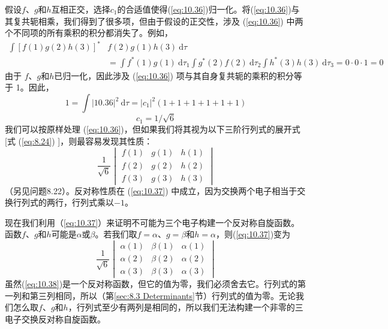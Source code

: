     假设$f$、$g$和$h$互相正交，选择$c_1$的合适值使得(\ref{eq:10.36})归一化。将(\ref{eq:10.36})与其复共轭相乘，我们得到了很多项，但由于假设的正交性，涉及 (\ref{eq:10.36}) 中两个不同项的所有乘积的积分都消失了。例如，
    \begin{equation*}
        \begin{aligned}
            \int \left[f\left(1\right)g\left(2\right)h\left(3\right)\right]^*&f\left(2\right)g\left(1\right)h\left(3\right) \:\mathrm{d}\tau \\
            &= \int f^*\left(1\right)g\left(1\right)\:\mathrm{d}\tau_1 \int g^*\left(2\right)f\left(2\right)\:\mathrm{d}\tau_2 \int h^*\left(3\right)h\left(3\right)\:\mathrm{d}\tau_3 = 0 \cdot 0 \cdot 1 = 0
        \end{aligned}
    \end{equation*}
    由于 $f$、$g$和$h$已归一化，因此涉及 (\ref{eq:10.36}) 项与其自身复共轭的乘积的积分等于 1。因此，
    \begin{equation*}
        1 = \int \left|10.36\right|^2 \:\mathrm{d}\tau = \left|c_1\right|^2 \left(1+1+1+1+1+1\right)
    \end{equation*}
    \begin{equation*}
        c_1 = 1 / \sqrt{6}
    \end{equation*}
    我们可以按原样处理 (\ref{eq:10.36})，但如果我们将其视为以下三阶行列式的展开式 [式 (\ref{eq:8.24}) ]，则最容易发现其性质：
    \begin{equation}
        \boxed{ 
            \frac{1}{\sqrt{6}}\begin{vmatrix}
                f\left(1\right) & g\left(1\right) & h\left(1\right) \\
                f\left(2\right) & g\left(2\right) & h\left(2\right) \\
                f\left(3\right) & g\left(3\right) & h\left(3\right)
            \end{vmatrix}
        }
        \label{eq:10.37}
    \end{equation}
    （另见问题8.22）。反对称性质在 (\ref{eq:10.37}) 中成立，因为交换两个电子相当于交换行列式的两行，行列式乘以$-1$。

    现在我们利用（\ref{eq:10.37}）来证明不可能为三个电子构建一个反对称自旋函数。函数$f$、$g$和$h$可能是$\alpha$或$\beta$。若我们取$f = \alpha$、$g = \beta$和$h = \alpha$，则(\ref{eq:10.37})变为
    \begin{equation}
        \frac{1}{\sqrt{6}}\begin{vmatrix}
            \alpha\left(1\right) & \beta\left(1\right) & \alpha\left(1\right) \\
            \alpha\left(2\right) & \beta\left(2\right) & \alpha\left(2\right) \\
            \alpha\left(3\right) & \beta\left(3\right) & \alpha\left(3\right)
        \end{vmatrix}
        \label{eq:10.38}
    \end{equation}
    虽然(\ref{eq:10.38})是一个反对称函数，但它的值为零，我们必须舍去它。行列式的第一列和第三列相同，所以（第\ref{sec:8.3 Determinants}节）行列式的值为零。无论我们怎么取$f$、$g$和$h$，行列式至少有两列是相同的，所以我们无法构建一个非零的三电子交换反对称自旋函数。

